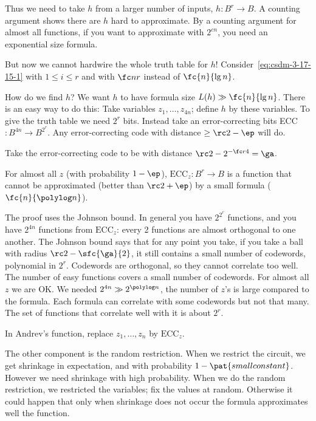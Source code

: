 Thus we need to take $h$ from a larger number of inputs, $h:B^r\to B$. A counting argument shows there are $h$ hard to approximate. 
By a counting argument for almost all functions, if you want to approximate with $2^{cn}$, you need an exponential size formula.

But now we cannot hardwire the whole truth table for $h$! Consider~\eqref{eq:csdm-3-17-15-1} with $1\le i \le r$ and with $\fc nr$ instead of $\fc{n}{\lg n}$. 

How do we find $h$? We want $h$ to have formula size $L(h)\gg \fc{n}{\lg n}$. There is an easy way to do this: Take variables $z_1,\ldots, z_{4n}$; define $h$ by these variables. To give the truth table we need $2^r$ bits. Instead take an error-correcting bits ECC$: B^{4n}\to B^{2^r}$. Any error-correcting code with distance $\ge \rc2-\ep$ will do.

Take the error-correcting code to be with distance $\rc2-2^{-\fc r4}=\ga$.
\begin{thm}
For almost all $z$ (with probability $1-\ep$), $\text{ECC}_z:B^r\to B$ is a function that cannot be approximated (better than $\rc2+\ep$) by a small formula ($\fc{n}{\polylog n}$).
%
\end{thm}
The proof uses the Johnson bound. 
In general you have $2^{2^r}$ functions, and you have $2^{4n}$ functions from $\text{ECC}_z$: every 2 functions are almost orthogonal to one another. The Johnson bound says that for any point you take, if you take a ball with radius $\rc2-\sfc{\ga}{2}$, it still contains a small number of codewords, polynomial in $2^r$. Codewords are orthogonal, so they cannot correlate too well. %
The number of easy functions covers a small number of codewords. For almost all $z$ we are OK.
We needed $2^{4n}\gg 2^{\polylog n}$, the number of $z$'s is large compared to the formula. Each formula can correlate with some codewords but not that many. The set of functions that correlate well with it is about $2^r$. %

In Andrev's function, replace $z_1,\ldots, z_n$ by $\text{ECC}_z$.


The other component is the random restriction. %
When we restrict the circuit, we get shrinkage in expectation, and with probability $1-\pat{small constant}$. However we need shrinkage with high probability. When we do the random restriction, we restricted the variables; fix the values at random. Otherwise it could happen that only when shrinkage does not occur the formula approximates well the function.

